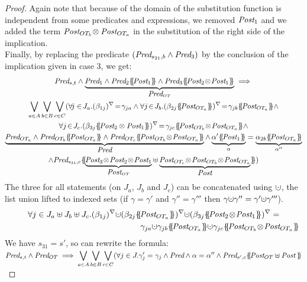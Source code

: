 \documentclass{lmcs}
\newcommand{\shortotimes}{\!\otimes\!}
\begin{document}
\begin{proof}
Again note that because of the domain  of the substitution function is independent from some predicates and expressions, we removed $\Post_1$ and  we  added the term $\Post_{OT_{b}}\shortotimes\,\Post_{OT_a}$ in the substitution of the right side of the implication.\\
Finally, by replacing the predicate $(\Pred_{s_{21},b} \land  \Pred_3)$
by the conclusion of the  implication given in case 3, we get:
\begin{multline*}\Pred_{s,t} \land \underbrace{\Pred_1\land \Pred_2\subst{\Post_1} \land \Pred_3\subst{\Post_2\shortotimes\Post_1}}_{\Pred_{OT}}\implies\\
 {\bigvee_{a\in A}}\, {\bigvee_{b\in B}}\, {\bigvee_{c\in C}} 
(\forall\! j\in\! J_a.\vis{\beta_{1j}}\!=\!\gamma_{ja} \land  \forall j \!\in\! J_{b}.\vis{\beta_{2j}\subst{\Post_{OT_a}}}\!=\!\gamma_{jb} \subst{\Post_{OT_a}}  \land \\
 \forall j\!\in\! J_{c}. \vis{\beta_{3j} \subst{\Post_2\,\shortotimes\,\Post_1}} \!=\!\gamma_{jc} \subst{\Post_{OT_{b}}\shortotimes\Post_{OT_a}}  \land\\
   \underbrace{\Pred_{OT_a}\land\Pred_{OT_{b}} \subst{\Post_{OT_a}} \land 
  \Pred_{OT_{c}}\subst{\Post_{OT_{b}}\shortotimes\Post_{OT_a}}}_{\Pred} \land  \underbrace{\alpha'\subst{\Post_1}}_{\alpha}=\underbrace{\alpha_{2 b} \subst{\Post_{OT_a}}}_{\alpha''} \\\land \Pred_{s_{31},c}  \subst{\underbrace{\Post_3\shortotimes\Post_2\shortotimes\Post_1}_{\Post_{OT}}\uplus \underbrace{\Post_{OT_{c}}\shortotimes \Post_{OT_{b}}\shortotimes\Post_{OT_a}}_{\Post}})
\end{multline*}
The three for all statements (on $J_a$, $J_b$ and $J_c$) can be concatenated using $\dotcup$, the list union lifted to indexed sets (if $\gamma=\gamma'$ and $\gamma''=\gamma'''$ then $\gamma\dotcup\gamma''=\gamma'\dotcup\gamma'''$).
\begin{multline*}\forall j\in J_a\uplus J_b\uplus J_c.  \vis{\beta_{1j}}\dotcup \vis{\beta_{2j}\subst{\Post_{OT_a}}}\dotcup \vis{\beta_{3j} \subst{\Post_2\shortotimes\Post_1}}=\\ ~\hspace{5.5cm} \gamma_{j a} \dotcup \gamma_{jb} \subst{\Post_{OT_a}}  \dotcup \gamma_{jc} \subst{\Post_{OT_{b}}\shortotimes\Post_{OT_a}}
\end{multline*}
We have  $s_{31}=s'$, so can rewrite the formula:\\
$\Pred_{s,t} \land \Pred_{OT}\implies
\displaystyle{\bigvee_{a\in A}}\, \displaystyle{\bigvee_{b\in B}}\, \displaystyle{\bigvee_{c\in C}} 
(\forall j\in J.\gamma_j'=\gamma_j \land  \Pred \land \alpha=\alpha''  \land \Pred_{s',c}\subst{\Post_{OT}\uplus\Post\,}$\\


\end{proof}
\end{document}
